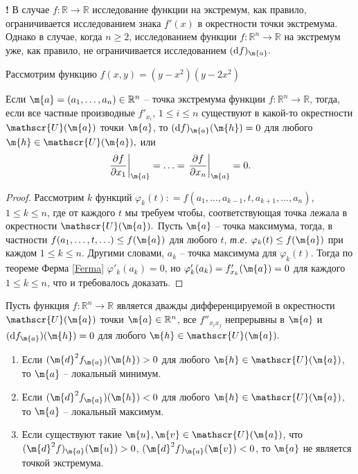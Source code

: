 \begin{mydanger}{\bf{!}}
    В случае $f:\mathbb{R} \to \mathbb{R}$ исследование функции на экстремум, как правило, ограничивается исследованием знака $f'(x)$ в окрестности точки экстремума. Однако в случае, когда $n\ge 2$, исследованием функции $f:\mathbb{R}^n \to \mathbb{R}$ на экстремум уже, как правило, не ограничивается исследованием $(\mathrm{d}f)_\m{a}.$ 
\end{mydanger}

\begin{example}
    Рассмотрим функцию $f(x,y) = (y-x^2)(y-2x^2)$
\end{example}

\begin{theorem}\label{nessary_condition_for_extr}
    Если $\m{a} = (a_1,\ldots, a_n) \in \mathbb{R}^n$ -- точка экстремума функции $f:\mathbb{R}^n \to \mathbb{R}$, тогда, если все частные производные $f'_{x_i}$, $1\le i \le n$ существуют в какой-то окрестности $\mathscr{U}(\m{a})$ точки $\m{a}$, то $(\mathrm{d}f)_\m{a}(\m{h}) = 0$ для любого $\m{h} \in \mathscr{U}(\m{a}),$ или
    \[
     \left.\frac{\partial f}{\partial x_1}\right|_\m{a} = \ldots = \left.\frac{\partial f}{\partial x_n}\right|_\m{a} = 0.   
    \]
\end{theorem}
\begin{proof}
    Рассмотрим $k$ функций $\varphi_k(t): = f(a_1,\ldots, a_{k-1}, t, a_{k+1}, \ldots, a_n)$, $1 \le k \le n$, где от каждого $t$ мы требуем чтобы, соответствующая точка лежала в окрестности $\mathscr{U}(\m{a}).$ Пусть $\m{a}$ -- точка максимума, тогда, в частности $f(a_1, \ldots, t, \ldots) \le f(\m{a})$ для любого $t$, \textit{т.е.} $\varphi_k(t) \le f(\m{a})$ при каждом $1 \le k \le n$. Другими словами, $a_k$ -- точка максимума для $\varphi_k(t)$. Тогда по теореме Ферма \ref{Ferma} $\varphi'_k(a_k) = 0$, но $\varphi'_k(a_k) = f'_{x_k}(\m{a}) = 0$ для каждого $1 \le k \le n$, что и требовалось доказать.
\end{proof}



\begin{theorem}
    Пусть функция $f:\mathbb{R}^n \to \mathbb{R}$ является дважды дифференцируемой в окрестности $\mathscr{U}(\m{a})$ точки $\m{a} \in \mathbb{R}^n$, все $f''_{x_ix_j}$ непрерывны в $\m{a}$ и $(\mathrm{d}f_\m{a})(\m{h}) = 0$ для любого $\m{h} \in \mathscr{U}(\m{a}).$ 
    \begin{enumerate}
        \item Если $(\m{d}^2f_\m{a})(\m{h}) >0 $ для любого $\m{h} \in \mathscr{U}(\m{a})$, то $\m{a}$ -- локальный минимум.
        \item Если $(\m{d}^2f_\m{a})(\m{h}) <0 $ для любого $\m{h} \in \mathscr{U}(\m{a})$, то $\m{a}$ -- локальный максимум.
        \item Если существуют такие $\m{u}, \m{v} \in \mathscr{U}(\m{a})$, что $(\m{d}^2f)_\m{a}(\m{u}) >0$, $(\m{d}^2f)_\m{a}(\m{v}) <0$, то $\m{a}$ не является точкой экстремума. 
    \end{enumerate}
\end{theorem}

